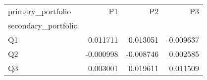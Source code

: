\begin{tabular}{lrrr}
\toprule
primary_portfolio & P1 & P2 & P3 \\
secondary_portfolio &  &  &  \\
\midrule
Q1 & 0.011711 & 0.013051 & -0.009637 \\
Q2 & -0.000998 & -0.008746 & 0.002585 \\
Q3 & 0.003001 & 0.019611 & 0.011509 \\
\bottomrule
\end{tabular}

